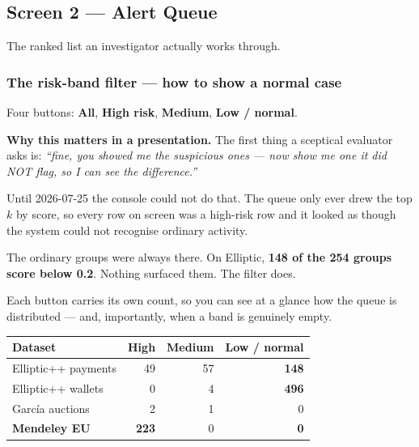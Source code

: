 \documentclass[11pt,a4paper]{article}
\begin{document}
\subsection{Screen 2 --- Alert Queue}

The ranked list an investigator actually works through.

\subsubsection*{The risk-band filter --- how to show a normal case}

Four buttons: \textbf{All}, \textbf{High risk}, \textbf{Medium},
\textbf{Low / normal}.

\begin{keybox}
\textbf{Why this matters in a presentation.} The first thing a sceptical
evaluator asks is: \emph{``fine, you showed me the suspicious ones --- now show
me one it did NOT flag, so I can see the difference.''}

Until 2026-07-25 the console could not do that. The queue only ever drew the
top $k$ by score, so every row on screen was a high-risk row and it looked as
though the system could not recognise ordinary activity.

The ordinary groups were always there. On Elliptic, \textbf{148 of the 254
groups score below 0.2}. Nothing surfaced them. The filter does.
\end{keybox}

Each button carries its own count, so you can see at a glance how the queue is
distributed --- and, importantly, when a band is genuinely empty.

\begin{center}\small
\begin{tabular}{@{}lrrr@{}}
\toprule
\textbf{Dataset} & \textbf{High} & \textbf{Medium} & \textbf{Low / normal} \\
\midrule
Elliptic++ payments & 49 & 57 & \textbf{148} \\
Elliptic++ wallets & 0 & 4 & \textbf{496} \\
García auctions & 2 & 1 & 0 \\
\textbf{Mendeley EU} & \textbf{223} & 0 & \textbf{0} \\
\bottomrule
\end{tabular}
\end{center}
\end{document}
